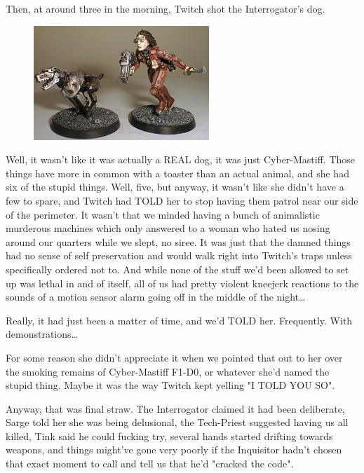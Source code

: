 Then, at around three in the morning, Twitch shot the Interrogator's dog.

\begin{figure}
	\begin{center}
		\includegraphics[width=\figwidth]{pics/17/35.png}
	\end{center}
\end{figure}
Well, it wasn't like it was actually a REAL dog, it was just Cyber-Mastiff. 
Those things have more in common with a toaster than an actual animal, and she had six of the stupid things. 
Well, five, but anyway, it wasn't like she didn't have a few to spare, and Twitch had TOLD her to stop having them patrol near our side of the perimeter. 
It wasn't that we minded having a bunch of animalistic murderous machines which only answered to a woman who hated us nosing around our quarters while we slept, no siree. 
It was just that the damned things had no sense of self preservation and would walk right into Twitch's traps unless specifically ordered not to. 
And while none of the stuff we'd been allowed to set up was lethal in and of itself, all of us had pretty violent kneejerk reactions to the sounds of a motion sensor alarm going off in the middle of the night… 

Really, it had just been a matter of time, and we'd TOLD her. 
Frequently. 
With demonstrations…

For some reason she didn't appreciate it when we pointed that out to her over the smoking remains of Cyber-Mastiff F1-D0, or whatever she'd named the stupid thing. 
Maybe it was the way Twitch kept yelling "I TOLD YOU SO".

Anyway, that was final straw. 
The Interrogator claimed it had been deliberate, Sarge told her she was being delusional, the Tech-Priest suggested having us all killed, Tink said he could fucking try, several hands started drifting towards weapons, and things might've gone very poorly if the Inquisitor hadn't chosen that exact moment to call and tell us that he'd "cracked the code".


